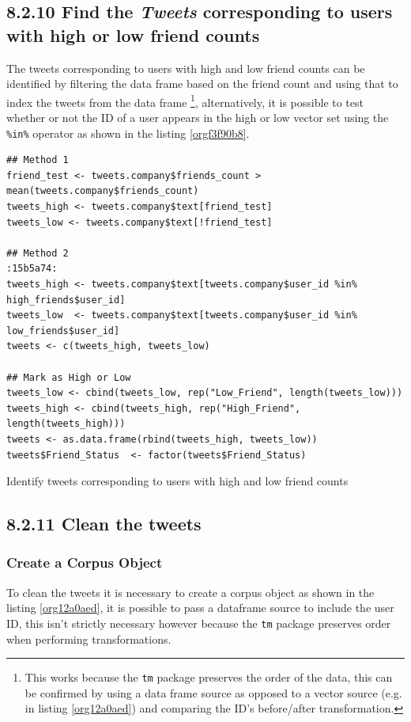 \documentclass[11pt]{article}
\begin{document}
\subsection{8.2.10 Find the \emph{Tweets} corresponding to users with high or low friend counts}
\label{sec:org569fb14}
The tweets corresponding to users with high and low friend counts can be
identified by filtering the data frame based on the friend count and using that
to index the tweets from the data frame \footnote{This works because the \texttt{tm} package preserves the order of the data, this can be confirmed by using a data frame source as opposed to a vector source (e.g. in listing \ref{org12a0aed}) and comparing the ID's before/after transformation.}, alternatively, it is possible
to test whether or not the ID of a user appears in the high or low vector
set using the \texttt{\%in\%} operator as shown in the listing \ref{orgf3f90b8}.

\begin{listing}[htbp]
\begin{verbatim}
## Method 1
friend_test <- tweets.company$friends_count > mean(tweets.company$friends_count)
tweets_high <- tweets.company$text[friend_test]
tweets_low <- tweets.company$text[!friend_test]

## Method 2                                                                 :15b5a74:
tweets_high <- tweets.company$text[tweets.company$user_id %in%  high_friends$user_id]
tweets_low  <- tweets.company$text[tweets.company$user_id %in%  low_friends$user_id]
tweets <- c(tweets_high, tweets_low)

## Mark as High or Low
tweets_low <- cbind(tweets_low, rep("Low_Friend", length(tweets_low)))
tweets_high <- cbind(tweets_high, rep("High_Friend", length(tweets_high)))
tweets <- as.data.frame(rbind(tweets_high, tweets_low))
tweets$Friend_Status  <- factor(tweets$Friend_Status)
\end{verbatim}
\caption{\label{orgf3f90b8}Identify tweets corresponding to users with high and low friend counts}
\end{listing}

\subsection{8.2.11 Clean the tweets}
\label{sec:org0f98981}
\subsubsection{Create a Corpus Object}
\label{sec:org0a63a69}
To clean the tweets it is necessary to create a corpus object as shown in the listing \ref{org12a0aed}, it is possible to pass a dataframe source to include the user ID, this isn't strictly necessary however because the \texttt{tm} package preserves order when performing transformations.
\end{document}
